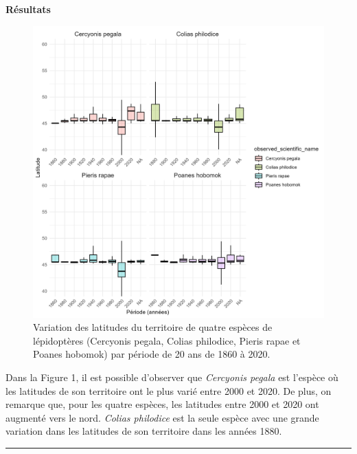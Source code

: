 \documentclass[9pt,twocolumn,twoside,]{pnas-new}
\begin{document}
\vspace{10pt}

\textbf{Résultats}

\begin{figure}[H]

{\centering \includegraphics[width=0.8\linewidth]{graphique_latitude} 

}

\caption{Variation des latitudes du territoire de quatre espèces de lépidoptères (Cercyonis pegala, Colias philodice, Pieris rapae et Poanes hobomok) par période de 20 ans de 1860 à 2020.}\label{fig:fig1}
\end{figure}

Dans la Figure 1, il est possible d'observer que \emph{Cercyonis pegala}
est l'espèce où les latitudes de son territoire ont le plus varié entre
2000 et 2020. De plus, on remarque que, pour les quatre espèces, les
latitudes entre 2000 et 2020 ont augmenté vers le nord. \emph{Colias
philodice} est la seule espèce avec une grande variation dans les
latitudes de son territoire dans les années 1880.

\begin{center}\rule{0.5\linewidth}{0.5pt}\end{center}
\end{document}
